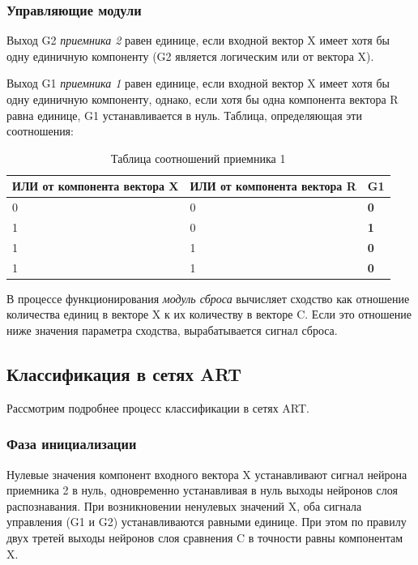 \documentclass[14pt,a4paper,report]{article}
\begin{document}
\subsubsection{Управляющие модули}

Выход G2 \textit{приемника 2} равен единице, если входной вектор X имеет хотя бы одну единичную компоненту (G2 является логическим или от вектора X).

Выход G1 \textit{приемника 1} равен единице, если входной вектор X имеет хотя бы одну единичную компоненту, однако, если хотя бы одна компонента вектора R равна единице, G1 устанавливается в нуль. Таблица, определяющая эти соотношения: 

\begin{table}[h!]
	\centering
	\bgroup
	\def\arraystretch{1}
	\begin{tabular}{ | P{3.8cm} | P{3.8cm} | P{1.8cm} | }
		\hline
		ИЛИ от компонента вектора X & ИЛИ от компонента вектора R & \textbf{G1} 
		\\ \hline
		
		0 & 0 & \textbf{0} \\ \hline
		
		1 & 0 & \textbf{1} \\ \hline
		
		1 & 1 & \textbf{0} \\ \hline
		
		1 & 1 & \textbf{0} \\ \hline
		
	\end{tabular}
	\egroup
	\caption{Таблица соотношений приемника 1}
	\label{table:1}
\end{table}

В процессе функционирования \textit{модуль сброса} вычисляет сходство как отношение количества единиц в векторе X к их количеству в векторе C. Если это отношение ниже значения параметра сходства, вырабатывается сигнал сброса. 


\subsection{Классификация в сетях ART}

Рассмотрим подробнее процесс классификации в сетях ART. 

\subsubsection{Фаза инициализации}

Нулевые значения компонент входного вектора X устанавливают сигнал нейрона приемника 2 в нуль, одновременно устанавливая в нуль выходы нейронов слоя распознавания. При возникновении ненулевых значений X, оба сигнала управления (G1 и G2) устанавливаются равными единице. При этом по правилу двух третей выходы нейронов слоя сравнения C в точности равны компонентам X.
\end{document}
